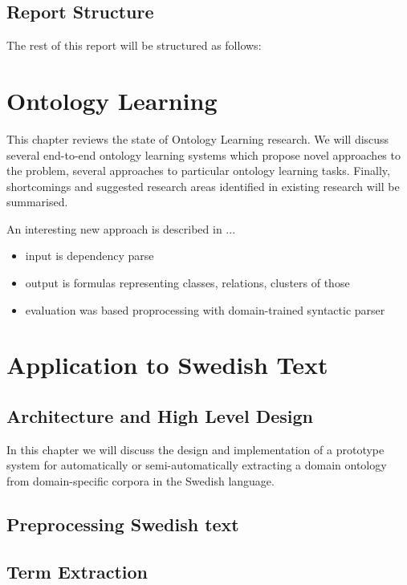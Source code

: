 \documentclass[a4paper]{report}
\begin{document}
\section{Report Structure}

The rest of this report will be structured as follows:

\chapter{Ontology Learning}

This chapter reviews the state of Ontology Learning research.
We will discuss several end-to-end ontology learning systems which propose novel approaches to the problem, several approaches to particular ontology learning tasks.
Finally, shortcomings and suggested research areas identified in existing research will be summarised.

An interesting new approach is described in \cite{Poon2010OntoUSP}...
\begin{itemize}
  \item{input is dependency parse}
  \item{output is formulas representing classes, relations, clusters of those}
  \item{evaluation was based proprocessing with domain-trained syntactic parser}
\end{itemize}

\chapter{Application to Swedish Text}

\section{Architecture and High Level Design}

In this chapter we will discuss the design and implementation of a prototype system for automatically or semi-automatically extracting a domain ontology from domain-specific corpora in the Swedish language.

\section{Preprocessing Swedish text}

\section{Term Extraction}
\end{document}
